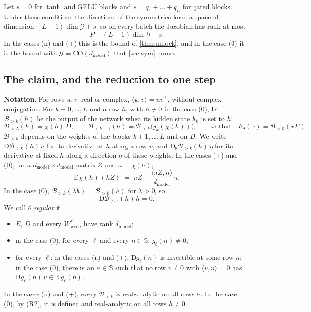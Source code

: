 \documentclass[10pt]{article}
\theoremstyle{definition}
\theoremstyle{remark}
\newcommand{\R}{\mathbb{R}}
\newcommand{\Wwrite}{W_{\mathrm{write}}}
\newcommand{\dm}{d_{\mathrm{model}}}
\newcommand{\CO}{\mathrm{CO}}
\newcommand{\Der}{\mathrm{D}}
\newcommand{\G}{\mathcal{G}}
\newcommand{\para}[1]{\smallskip\noindent\textbf{#1}\hspace{0.5em}}
\begin{document}
Let $s = 0$ for $\tanh$ and GELU blocks and $s = q_1 + \dots + q_L$ for gated blocks. Under these conditions the directions of the symmetries form a space of dimension $(L+1)\dim\G + s$, so on every batch the Jacobian has rank at most
\begin{equation}\label{eq:e0upper}
P - (L+1)\dim\G - s .
\end{equation}
In the cases (n) and (+) this is the bound of \cref{thm:unlock}, and in the case (0) it is the bound with $\G = \CO(\dm)$ that \cref{sec:sym} names.

\subsection{The claim, and the reduction to one step}\label{app:claim}

\para{Notation.} For rows $u, v$, real or complex, $\langle u, v\rangle = uv^\top$, without complex conjugation. For $k = 0, \dots, L$ and a row $h$, with $h \neq 0$ in the case (0), let $\mathcal B_{>k}(h)$ be the output of the network when its hidden state $h_k$ is set to $h$:
\[
\mathcal B_{>L}(h) = \chi(h)\,D, \qquad \mathcal B_{>k-1}(h) = \mathcal B_{>k}\big(g_k(\chi(h))\big), \qquad\text{so that}\quad F_\theta(x) = \mathcal B_{>0}(xE).
\]
$\mathcal B_{>k}$ depends on the weights of the blocks $k+1, \dots, L$ and on $D$. We write $\Der\mathcal B_{>k}(h)\,v$ for its derivative at $h$ along a row $v$, and $\Der_\theta\mathcal B_{>k}(h)\,\eta$ for its derivative at fixed $h$ along a direction $\eta$ of these weights. In the cases (+) and (0), for a $\dm\times\dm$ matrix $Z$ and $n = \chi(h)$,
\begin{equation}\label{eq:sbDN}
\Der\chi(h)\,(hZ) \;=\; nZ - \frac{\langle nZ, n\rangle}{\dm}\,n .
\end{equation}
In the case (0), $\mathcal B_{>k}(\lambda h) = \mathcal B_{>k}(h)$ for $\lambda > 0$, so
\begin{equation}\label{eq:e0radial}
\Der\mathcal B_{>k}(h)\,h = 0 .
\end{equation}
We call $\theta$ \emph{regular} if
\begin{itemize}[leftmargin=2.9em]
\item[(R1)] $E$, $D$ and every $\Wwrite^{\ell}$ have rank $\dm$;
\item[(R2)] in the case (0), for every $\ell$ and every $n \in \mathbb S$: $g_\ell(n) \neq 0$;
\item[(R3)] for every $\ell$: in the cases (n) and (+), $\Der g_\ell(n)$ is invertible at some row $n$; in the case (0), there is an $n \in \mathbb S$ such that no row $v \neq 0$ with $\langle v, n\rangle = 0$ has $\Der g_\ell(n)\,v \in \R\,g_\ell(n)$.
\end{itemize}
In the cases (n) and (+), every $\mathcal B_{>k}$ is real-analytic on all rows $h$. In the case (0), by (R2), it is defined and real-analytic on all rows $h \neq 0$.
\end{document}
